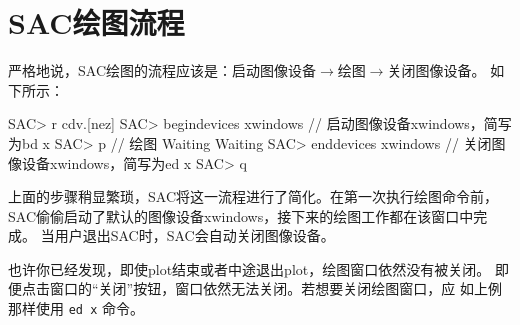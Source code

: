 \section{SAC绘图流程}
严格地说，SAC绘图的流程应该是：启动图像设备$\rightarrow$绘图$\rightarrow$关闭图像设备。
如下所示：
\begin{SACCode}
SAC> r cdv.[nez]
SAC> begindevices xwindows      // 启动图像设备xwindows，简写为bd x
SAC> p                          // 绘图
Waiting
Waiting
SAC> enddevices xwindows        // 关闭图像设备xwindows，简写为ed x
SAC> q
\end{SACCode}

上面的步骤稍显繁琐，SAC将这一流程进行了简化。在第一次执行绘图命令前，
SAC偷偷启动了默认的图像设备xwindows，接下来的绘图工作都在该窗口中完成。
当用户退出SAC时，SAC会自动关闭图像设备。

也许你已经发现，即使plot结束或者中途退出plot，绘图窗口依然没有被关闭。
即便点击窗口的``关闭''按钮，窗口依然无法关闭。若想要关闭绘图窗口，应
如上例那样使用 \texttt{ed x} 命令。
